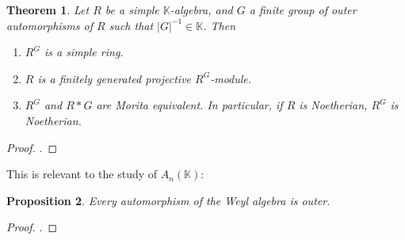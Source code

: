 \documentclass[10pt,a4paper]{amsart}
\newtheorem{theorem}{Theorem}[section]
\newtheorem{proposition}[theorem]{Proposition}
\newcommand{\Weyl}{A_n(\mathbb{K})} %
\def\k{\mathbb K}
\def\k{\mathbb K}
\begin{document}
\begin{theorem}\label{essential-invariant}
    Let $R$ be a simple $\k$-algebra, and $G$ a finite group of outer automorphisms of $R$ such that $|G|^{-1} \in \k$. Then
    \begin{enumerate}
        \item $R^G$ is a simple ring.
        \item $R$ is a finitely generated projective $R^G$-module.
        \item $R^G$ and $R*G$ are Morita equivalent. In particular, if $R$ is Noetherian, $R^G$ is Noetherian.
    \end{enumerate}
\end{theorem}

\begin{proof}
    \cite[Theorem 2.4, Theorem 2.5, Corollary 2.6]{Montgomery}.
\end{proof}

This is relevant to the study of $\Weyl$:
\begin{proposition}\label{Weyl-outer}
    Every automorphism of the Weyl algebra is outer.
\end{proposition}
\begin{proof}
    \cite[2.4.1]{Dumas}.
\end{proof}
\end{document}

